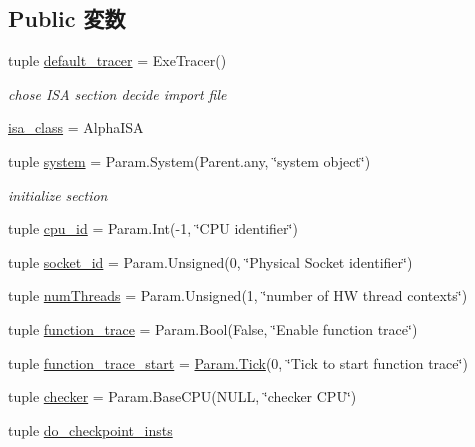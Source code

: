\subsection*{Public 変数}
\begin{DoxyCompactItemize}
\item 
tuple \hyperlink{classBaseCPU_aaed212049a9dd45ea37d46403a76713a}{default\_\-tracer} = ExeTracer()
\begin{DoxyCompactList}\small\item\em chose ISA section decide import file \item\end{DoxyCompactList}\item 
\hyperlink{classBaseCPU_a7834205597f6fdfa3801594ba899afcb}{isa\_\-class} = AlphaISA
\item 
tuple \hyperlink{classBaseCPU_ab737471139f5a296e5b26e8a0e1b0744}{system} = Param.System(Parent.any, \char`\"{}system object\char`\"{})
\begin{DoxyCompactList}\small\item\em initialize section \item\end{DoxyCompactList}\item 
tuple \hyperlink{classBaseCPU_a367f5d07843a54b9454fa6f733fd6d50}{cpu\_\-id} = Param.Int(-\/1, \char`\"{}CPU identifier\char`\"{})
\item 
tuple \hyperlink{classBaseCPU_a15fdecad084e8c7e04ac559e4636c87d}{socket\_\-id} = Param.Unsigned(0, \char`\"{}Physical Socket identifier\char`\"{})
\item 
tuple \hyperlink{classBaseCPU_aac03a586f9fcb28bcbe8c3721888fa93}{numThreads} = Param.Unsigned(1, \char`\"{}number of HW thread contexts\char`\"{})
\item 
tuple \hyperlink{classBaseCPU_ac5000747a59175f68c1efa108516eb16}{function\_\-trace} = Param.Bool(False, \char`\"{}Enable function trace\char`\"{})
\item 
tuple \hyperlink{classBaseCPU_ad9ee026563aba78102ce184249738572}{function\_\-trace\_\-start} = \hyperlink{base_2types_8hh_a5c8ed81b7d238c9083e1037ba6d61643}{Param.Tick}(0, \char`\"{}Tick to start function trace\char`\"{})
\item 
tuple \hyperlink{classBaseCPU_ad79de7771e2fdfe4aa9ba3d4f7e6972c}{checker} = Param.BaseCPU(NULL, \char`\"{}checker CPU\char`\"{})
\item 
tuple \hyperlink{classBaseCPU_a6f7595c08ddf31d6a8646b0e14b28c46}{do\_\-checkpoint\_\-insts}
\item 

\end{DoxyCompactItemize}
